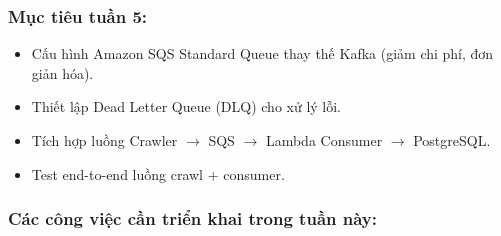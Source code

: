 \hypertarget{mux1ee5c-tiuxeau-tuux1ea7n-5}{%
\subsubsection{Mục tiêu tuần 5:}}

\begin{itemize}
\tightlist
\item
  Cấu hình Amazon SQS Standard Queue thay thế Kafka (giảm chi phí, đơn
  giản hóa).
\item
  Thiết lập Dead Letter Queue (DLQ) cho xử lý lỗi.
\item
  Tích hợp luồng Crawler \(\rightarrow\) SQS \(\rightarrow\) Lambda
  Consumer \(\rightarrow\) PostgreSQL.
\item
  Test end-to-end luồng crawl + consumer.
\end{itemize}

\hypertarget{cuxe1c-cuxf4ng-viux1ec7c-cux1ea7n-triux1ec3n-khai-trong-tuux1ea7n-nuxe0y}{%
\subsubsection{Các công việc cần triển khai trong tuần
này:}}


